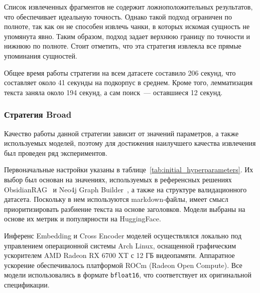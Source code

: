 Список извлеченных фрагментов не содержит ложноположительных результатов,
что обеспечивает идеальную точность. Однако такой подход ограничен по полноте,
так как он не способен извлечь чанки, в которых искомая сущность не упомянута явно.
Таким образом, подход задает верхнюю границу по точности и
нижнюю по полноте.
Стоит отметить, что эта стратегия извлекла все прямые упоминания сущностей.

Общее время работы стратегии на всем датасете составило 206 секунд,
что составляет около 41 секунды на подкорпус в среднем.
Кроме того, лемматизация текста заняла около 194 секунд,
а сам поиск~--- оставшиеся 12 секунд.

\subsubsection*{Стратегия Broad}

Качество работы данной стратегии зависит от значений параметров, а также используемых моделей,
поэтому для достижения наилучшего качества извлечения был проведен ряд экспериментов.

Первоначальные настройки указаны в таблице~\ref{tab:initial_hyperparameters}.
Их выбор был основан на значениях, используемых в референсных решениях
ObsidianRAG~\cite{obsidianrag} и Neo4j Graph Builder~\cite{neo4j_graph_builder},
а также на структуре валидационного датасета.
Поскольку в нем используются markdown-файлы,
имеет смысл приоритизировать разбиение текста на основе
заголовков.
Модели выбраны на основе их метрик и популярности на HuggingFace.

Инференс Embedding и Cross Encoder моделей осуществлялся локально
под управлением операционной системы Arch Linux,
оснащенной графическим ускорителем AMD Radeon RX 6700 XT с 12 ГБ видеопамяти.
Аппаратное ускорение обеспечивалось платформой ROCm (Radeon Open Compute).
Все модели использовались в формате \texttt{bfloat16},
что соответствует их оригинальной спецификации.

